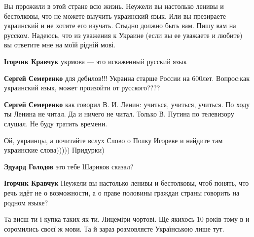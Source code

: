 Вы пррожили в этой стране всю жизнь. Неужели вы настолько ленивы и бестолковы,
что не можете выучить украинский язык. Или вы презираете украинский и не хотите
его изучать. Стыдно должно быть вам. Пишу вам на русском. Надеюсь, что из
уважения к Украине (если вы ее уважаете и любите) вы ответите мне на моїй
рідній мові.

\begin{itemize}

\textbf{Ігорчик Кравчук} укрмова --- это искаженный русский язык


\textbf{Сергей Семеренко} для дебилов!!! Украина старше России на 600лет. Вопрос:как украинский язык, может произойти от русского????


\textbf{Сергей Семеренко} как говорил В. И. Ленин: учиться, учиться, учиться.
По ходу ты Ленина не читал. Да и ничего не читал. Только В. Путина по телевизору слушал. Не буду тратить времени.👋


Ой, украинцы, а почитайте вслух Слово о Полку Игореве и найдите там украинские слова))))) Придурки)


\textbf{Эдуард Голодов} это тебе Шариков сказал?


\textbf{Ігорчик Кравчук} Неужели вы настолько ленивы и бестолковы, чтоб понять,
что речь идёт не о возможности, а о праве половины граждан страны говорить на
родном языке?
\end{itemize}



Та виєш ти і купка таких як ти. Лицеміри чортові. Ще якихось 10 років тому в и
соромились своєї ж мови. Та й зараз розмовляєте Українською лише тут.


